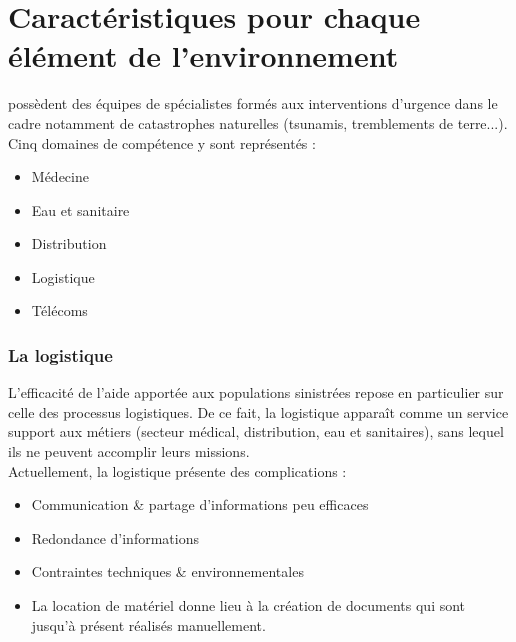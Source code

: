 \section{Caractéristiques pour chaque élément de l'environnement}
\mo possèdent des équipes de spécialistes formés aux interventions d'urgence dans le cadre notamment de catastrophes naturelles (tsunamis, tremblements de terre...).
Cinq domaines de compétence y sont représentés :
\begin{itemize}
\item Médecine
\item Eau et sanitaire
\item Distribution
\item Logistique
\item Télécoms
\end{itemize}
\subsubsection{La logistique}
L'efficacité de l'aide apportée aux populations sinistrées repose en particulier sur celle des processus logistiques. De ce fait, la logistique apparaît comme un service support aux métiers (secteur médical, distribution, eau et sanitaires), sans lequel ils ne peuvent accomplir leurs missions.
\\
Actuellement, la logistique présente des complications :
\begin{itemize}
\item Communication \& partage d'informations peu efficaces
\item Redondance d'informations
\item Contraintes techniques \& environnementales
\item La location de matériel donne lieu à la création de documents qui sont jusqu'à présent réalisés manuellement.
\end{itemize}

